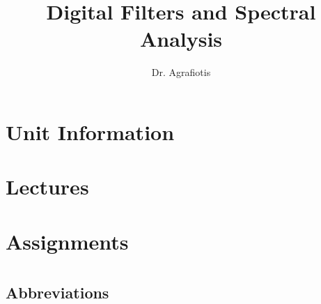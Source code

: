 \documentclass[12pt,a4paper,twoside]{book}
\author{Dr. Agrafiotis}
\title{Digital Filters and Spectral Analysis}
\theoremstyle{plain}
\theoremstyle{definition}
\begin{document}
\maketitle
\tableofcontents

\part{Unit Information}

\part{Lectures}























\part{Assignments}
\part*{}
\chapter*{Abbreviations}


\end{document}
